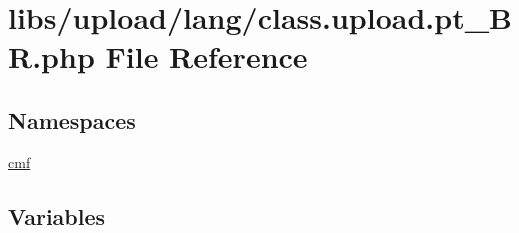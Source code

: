 \hypertarget{class_8upload_8pt___b_r_8php}{}\section{libs/upload/lang/class.upload.\+pt\+\_\+\+B\+R.\+php File Reference}
\label{class_8upload_8pt___b_r_8php}
\subsection*{Namespaces}
\begin{DoxyCompactItemize}
\item 
 \hyperlink{namespacecmf}{cmf}
\end{DoxyCompactItemize}
\subsection*{Variables}
